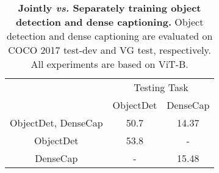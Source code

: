 \documentclass[10pt,twocolumn,letterpaper]{article}
\begin{document}
\begin{table}[t!]
	\begin{center}	
		\setlength{\tabcolsep}{10pt}
		\begin{tabular}{c|cc}
			\rowcolor{mygray}
			&\multicolumn{2}{c}{{Testing Task}}\\
			\rowcolor{mygray}
			\multirow{-2}{*}{Training Task}&ObjectDet&DenseCap\\
			\shline
			ObjectDet, DenseCap&50.7&14.37\\
			ObjectDet&53.8&-\\
			DenseCap&-&15.48\\
			\hline
		\end{tabular}
	\end{center}
	\vspace{-3mm}
	\caption{\textbf{Jointly \emph{vs.} Separately training object detection and dense captioning.} Object detection and dense captioning are evaluated on COCO 2017 test-dev and VG test, respectively. All experiments are based on ViT-B.}
	\label{tab:joint}
\end{table}
\end{document}

